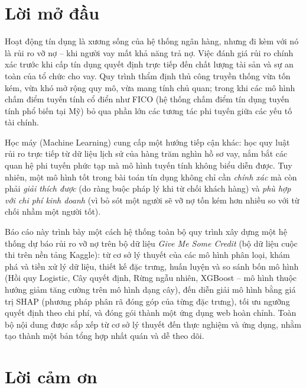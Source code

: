\documentclass[12pt,a4paper,oneside]{report}
\theoremstyle{vnplain}
\theoremstyle{vndef}
\begin{document}

\chapter*{Lời mở đầu}

Hoạt động tín dụng là xương sống của hệ thống ngân hàng, nhưng đi kèm với nó là rủi ro
vỡ nợ -- khi người vay mất khả năng trả nợ. Việc đánh giá rủi ro chính xác trước khi cấp
tín dụng quyết định trực tiếp đến chất lượng tài sản và sự an toàn của tổ chức cho vay.
Quy trình thẩm định thủ công truyền thống vừa tốn kém, vừa khó mở rộng quy mô, vừa mang
tính chủ quan; trong khi các mô hình chấm điểm tuyến tính cổ điển như FICO (hệ thống
chấm điểm tín dụng tuyến tính phổ biến tại Mỹ) bỏ qua phần
lớn các tương tác phi tuyến giữa các yếu tố tài chính.

Học máy (Machine Learning) cung cấp một hướng tiếp cận khác: học quy luật rủi ro trực
tiếp từ dữ liệu lịch sử của hàng trăm nghìn hồ sơ vay, nắm bắt các quan hệ phi tuyến phức
tạp mà mô hình tuyến tính không biểu diễn được. Tuy nhiên, một mô hình tốt trong bài toán
tín dụng không chỉ cần \emph{chính xác} mà còn phải \emph{giải thích được} (do ràng buộc
pháp lý khi từ chối khách hàng) và \emph{phù hợp với chi phí kinh doanh} (vì bỏ sót một
người sẽ vỡ nợ tốn kém hơn nhiều so với từ chối nhầm một người tốt).

Báo cáo này trình bày một cách hệ thống toàn bộ quy trình xây dựng một hệ thống dự báo
rủi ro vỡ nợ trên bộ dữ liệu \emph{Give Me Some Credit} (bộ dữ liệu cuộc thi trên nền tảng
Kaggle): từ cơ sở lý thuyết của
các mô hình phân loại, khám phá và tiền xử lý dữ liệu, thiết kế đặc trưng, huấn luyện và
so sánh bốn mô hình (Hồi quy Logistic, Cây quyết định, Rừng ngẫu nhiên, XGBoost -- mô
hình thuộc hướng giảm tăng cường trên mô hình dạng cây), đến diễn giải mô hình bằng giá
trị SHAP (phương pháp phân rã đóng góp của từng đặc trưng), tối ưu ngưỡng quyết định theo
chi phí, và đóng gói thành một ứng dụng web hoàn chỉnh. Toàn bộ nội dung được sắp xếp từ
cơ sở lý thuyết đến thực nghiệm và ứng dụng, nhằm tạo thành một bản tổng hợp nhất quán và
dễ theo dõi.

\chapter*{Lời cảm ơn}
\end{document}
